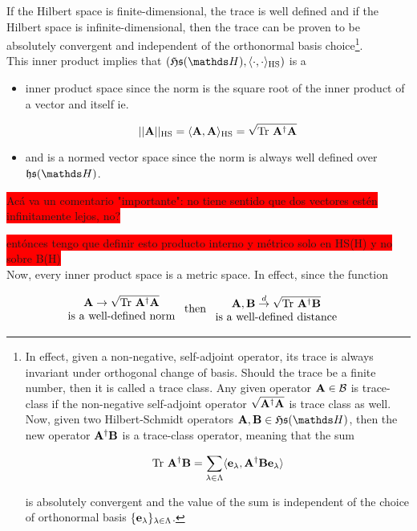 \documentclass{homework}
\begin{document}
If the Hilbert space is finite-dimensional, the trace is well defined and if the Hilbert space is infinite-dimensional, then the trace can be proven to be absolutely convergent and independent of the orthonormal basis choice\footnote{In effect, given a non-negative, self-adjoint operator, its trace is always invariant under orthogonal change of basis. Should the trace be a finite number, then it is called a trace class. Any given operator ${\bf A} \in \mathcal{B}$ is trace-class if the non-negative self-adjoint operator $\sqrt{{\bf A^\dagger} {\bf A}}$ is trace class as well. Now, given two Hilbert-Schmidt operators ${\bf A}, {\bf B} \in \mathfrak{H}\mathfrak{s}(\hilbert)$, then the new operator $\bf A^\dagger{\bf B}$ is a trace-class operator, meaning that the sum 

$$
\textnormal{Tr } {\bf A^\dagger}{\bf B} = \sum_{\lambda \in \Lambda} \langle {\bf e}_{\lambda}, {\bf A}^\dagger {\bf B} {\bf e}_{\lambda} \rangle 
$$

is absolutely convergent and the value of the sum is independent of the choice of orthonormal basis $\{{\bf e}_{\lambda}\}_{\lambda \in \Lambda}$. 
}. \\

This inner product implies that $(\mathfrak{H}\mathfrak{s}(\hilbert), \langle \cdot , \cdot \rangle_{\textnormal{HS}})$ is a

\begin{itemize}
    \item inner product space since the norm is the square root of the inner product of a vector and itself ie.
    
    $$
    ||{\bf A}||_{\textnormal{HS}} = \langle {\bf A} , {\bf A} \rangle_{\textnormal{HS}} = \sqrt{\textnormal{Tr } \bf A^\dagger {\bf A}}
    $$
    
    \item and is a normed vector space since the norm is always well defined over $\mathfrak{h}\mathfrak{s}(\hilbert)$. 
\end{itemize}

\colorbox{red}{Acá va un comentario "importante": no tiene sentido que dos vectores estén infinitamente lejos, no?} 

\colorbox{red}{entónces tengo que definir esto producto interno y métrico solo en HS(H) y no sobre B(H)} \\

Now, every inner product space is a metric space. In effect, since the function 

\begin{align*}
    \begin{array}{c}
         {\bf A} \rightarrow \sqrt{\textnormal{Tr } {\bf A^\dagger}{\bf A}}  \\
         \textnormal{is a well-defined norm}  
    \end{array} & \textnormal{ then }  \begin{array}{c}
         {\bf A}, {\bf B} \overset{d}{\rightarrow} \sqrt{\textnormal{Tr } {\bf A}^{\dagger} {\bf B}}  \\
         \textnormal{is a well-defined distance}
    \end{array}
\end{align*}
\end{document}
